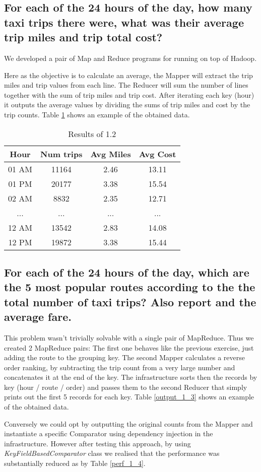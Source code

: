 \documentclass[conference,compsoc]{IEEEtran}
\begin{document}
\subsection{For each of the 24 hours of the day, how many taxi trips there were, what was their average trip miles and trip total cost?}
We developed a pair of Map and Reduce programs for running on top of Hadoop. \par Here as the objective is to calculate an average, the Mapper will extract the trip miles and trip values from each line. The Reducer will sum the number of lines together with the sum of trip miles and trip cost. After iterating each key (hour) it outputs the average values by dividing the sums of trip miles and cost by the trip counts. Table \ref{output_1_2} shows an example of the obtained data.
\begin{table}[!t]
\renewcommand{\arraystretch}{1.3}
\caption{Results of 1.2}
\label{output_1_2}
\centering
\begin{tabular}{c||c|c|c}
\hline
\bfseries Hour & \bfseries Num trips & \bfseries Avg Miles & \bfseries Avg Cost\\
\hline\hline
01 AM&11164&2.46&13.11\\
01 PM&20177&3.38&15.54\\
02 AM&8832&2.35&12.71\\
...&...&...&...\\
12 AM&13542&2.83&14.08\\
12 PM&19872&3.38&15.44\\
\hline
\end{tabular}
\end{table}

\subsection{For each of the 24 hours of the day, which are the 5 most popular routes according to the the total number of taxi trips? Also report and the average fare.}
This problem wasn't trivially solvable with a single pair of MapReduce. Thus we created 2 MapReduce pairs: The first one behaves like the previous exercise, just adding the route to the grouping key. The second Mapper calculates a reverse order ranking, by subtracting the trip count from a very large number and concatenates it at the end of the key. The infrastructure sorts then the records by key (hour / route / order) and passes them to the second Reducer that simply prints out the first 5 records for each key. Table \ref{output_1_3} shows an example of the obtained data. \par Conversely we could opt by outputting the original counts from the Mapper and instantiate a specific Comparator using dependency injection in the infrastructure. However after testing this approach, by using \textit{KeyFieldBasedComparator} class we realised that the performance was substantially reduced as by Table \ref{perf_1_4}.
\end{document}
